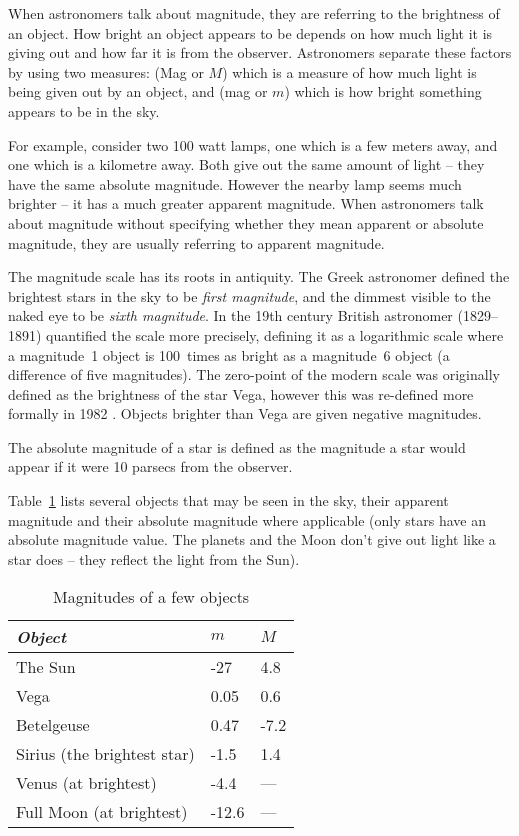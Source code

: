When astronomers talk about magnitude, they are referring to the
brightness of an object. How bright an object appears to be depends on
how much light it is giving out and how far it is from the observer.
Astronomers separate these factors by using two measures:  (Mag or $M$) which is a measure of how much light is being
given out by an object, and  (mag or $m$) which
is how bright something appears to be in the sky.

For example, consider two 100 watt lamps, one which is a few meters
away, and one which is a kilometre away. Both give out the same amount
of light -- they have the same absolute magnitude. However the nearby
lamp seems much brighter -- it has a much greater apparent magnitude.
When astronomers talk about magnitude without specifying whether they
mean apparent or absolute magnitude, they are usually referring to
apparent magnitude.

The magnitude scale has its roots in antiquity. The Greek astronomer
 defined the brightest stars in the sky to be \emph{first
magnitude}, and the dimmest visible to the naked eye to be \emph{sixth
magnitude}. In the 19th century British astronomer  (1829--1891)
quantified the scale more precisely, defining it as a logarithmic scale
where a magnitude~1 object is 100~times as bright as a magnitude~6
object (a difference of five magnitudes). The zero-point of the modern
scale was originally defined as the brightness of the star Vega, however
this was re-defined more formally in 1982 \citep{landolt}. Objects brighter
than Vega are given negative magnitudes.

The absolute magnitude of a star is defined as the magnitude a star
would appear if it were 10 parsecs from the observer.

Table~\ref{tab:Concepts:Magnitudes} lists several objects that may be seen
in the sky, their apparent magnitude and their absolute magnitude where
applicable (only stars have an absolute magnitude value. The planets and
the Moon don't give out light like a star does -- they reflect the light
from the Sun).

\begin{table}[htb]
  \centering
  \begin{tabular}{lll}
\toprule
\emph{Object} & $m$ & $M$\\\midrule
The Sun & -27 & 4.8\\
Vega & 0.05 & 0.6\\
Betelgeuse & 0.47 & -7.2\\
Sirius (the brightest star) & -1.5 & 1.4\\
Venus (at brightest) & -4.4 & ---\\
Full Moon (at brightest) & -12.6 & ---\\
\bottomrule
\end{tabular}
  \caption{Magnitudes of a few objects}
  \label{tab:Concepts:Magnitudes}
\end{table}


